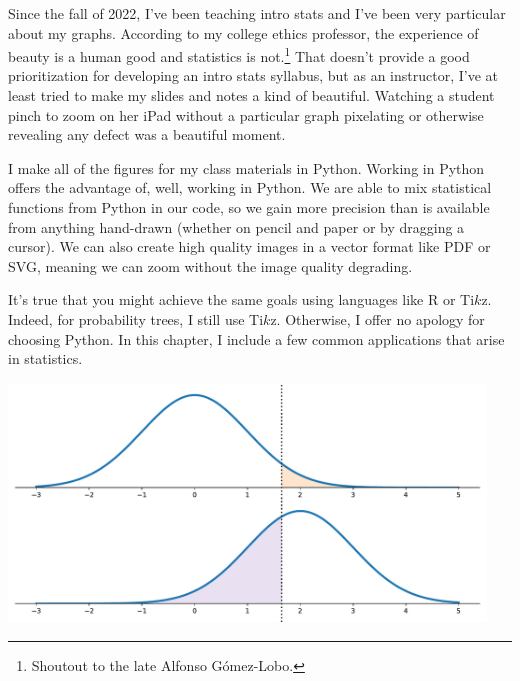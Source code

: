 
Since the fall of 2022, I've been teaching intro stats and I've been very particular about my graphs. According to my college ethics professor, the experience of beauty is a human good and statistics is not.\footnote{Shoutout to the late Alfonso G\'{o}mez-Lobo.} That doesn’t provide a good prioritization for developing an intro stats syllabus, but as an instructor, I've at least tried to make my slides and notes a kind of beautiful. Watching a student pinch to zoom on her iPad without a particular graph pixelating or otherwise revealing any defect was a beautiful moment. 

I make all of the figures for my class materials in Python. Working in Python offers the advantage of, well, working in Python. We are able to mix statistical functions from Python in our code, so we gain more precision than is available from anything hand-drawn (whether on pencil and paper or by dragging a cursor). We can also create high quality images in a vector format like PDF or SVG, meaning we can zoom without the image quality degrading. 

It's true that you might achieve the same goals using languages like R or Ti$k$z. Indeed, for probability trees, I still use Ti$k$z. Otherwise, I offer no apology for choosing Python. In this chapter, I include a few common applications that arise in statistics. 


\begin{center}
    \includegraphics[width = 0.95\textwidth]{figures/specialplots/errors-stacked.pdf}
\end{center}